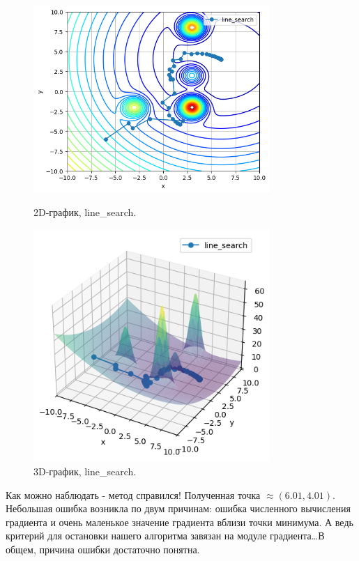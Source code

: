 \documentclass[a4paper,12pt]{article}
\begin{document}
\begin{figure}[H]
    \centering
    \includegraphics[width=0.8\textwidth]{images/task3/plot_levels_3_potential.png}
    \caption{2D-график, line\_search.}

    \centering
    \includegraphics[width=0.8\textwidth]{images/task3/plot_3d_3_potential.png}
    \caption{3D-график, line\_search.}
\end{figure}
\noindent
Как можно наблюдать - метод справился! Полученная точка $\approx (6.01,4.01)$. Небольшая ошибка возникла по двум причинам: ошибка численного вычисления градиента и очень маленькое значение градиента вблизи точки минимума. А ведь критерий для остановки нашего алгоритма завязан на модуле градиента\dots В общем, причина ошибки достаточно понятна.\\[0.5em]
\end{document}
